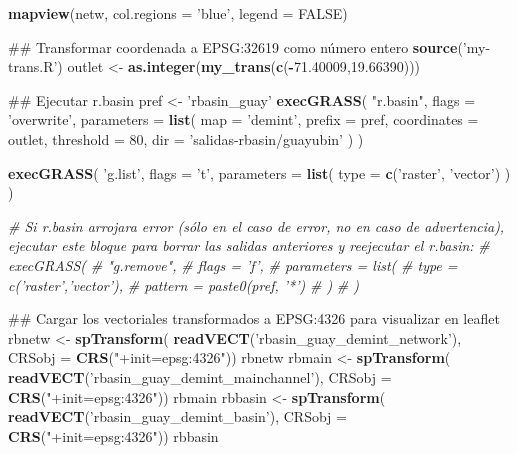 \documentclass[11pt,]{article}
\newenvironment{Shaded}{\begin{snugshade}}{\end{snugshade}}
\newcommand{\KeywordTok}[1]{\textcolor[rgb]{0.13,0.29,0.53}{\textbf{#1}}}
\newcommand{\DataTypeTok}[1]{\textcolor[rgb]{0.13,0.29,0.53}{#1}}
\newcommand{\DecValTok}[1]{\textcolor[rgb]{0.00,0.00,0.81}{#1}}
\newcommand{\FloatTok}[1]{\textcolor[rgb]{0.00,0.00,0.81}{#1}}
\newcommand{\StringTok}[1]{\textcolor[rgb]{0.31,0.60,0.02}{#1}}
\newcommand{\CommentTok}[1]{\textcolor[rgb]{0.56,0.35,0.01}{\textit{#1}}}
\newcommand{\OtherTok}[1]{\textcolor[rgb]{0.56,0.35,0.01}{#1}}
\newcommand{\OperatorTok}[1]{\textcolor[rgb]{0.81,0.36,0.00}{\textbf{#1}}}
\newcommand{\NormalTok}[1]{#1}
\begin{document}
\begin{Shaded}
\begin{Highlighting}[]
{{{{{\KeywordTok{mapview}\NormalTok{(netw, }\DataTypeTok{col.regions =} \StringTok{'blue'}\NormalTok{, }\DataTypeTok{legend =} \OtherTok{FALSE}\NormalTok{)}

\NormalTok{## Transformar coordenada a EPSG:32619 como número entero}
\KeywordTok{source}\NormalTok{(}\StringTok{'my-trans.R'}\NormalTok{)}
\NormalTok{outlet <-}\StringTok{ }\KeywordTok{as.integer}\NormalTok{(}\KeywordTok{my_trans}\NormalTok{(}\KeywordTok{c}\NormalTok{(}\OperatorTok{-}\FloatTok{71.40009}\NormalTok{,}\FloatTok{19.66390}\NormalTok{)))}

\NormalTok{## Ejecutar r.basin}
\NormalTok{pref <-}\StringTok{ 'rbasin_guay'}
\KeywordTok{execGRASS}\NormalTok{(}
  \StringTok{"r.basin"}\NormalTok{,}
  \DataTypeTok{flags =} \StringTok{'overwrite'}\NormalTok{,}
  \DataTypeTok{parameters =} \KeywordTok{list}\NormalTok{(}
    \DataTypeTok{map =} \StringTok{'demint'}\NormalTok{,}
    \DataTypeTok{prefix =}\NormalTok{ pref,}
    \DataTypeTok{coordinates =}\NormalTok{ outlet,}
    \DataTypeTok{threshold =} \DecValTok{80}\NormalTok{,}
    \DataTypeTok{dir =} \StringTok{'salidas-rbasin/guayubin'}
\NormalTok{  )}
\NormalTok{)}

\KeywordTok{execGRASS}\NormalTok{(}
  \StringTok{'g.list'}\NormalTok{,}
  \DataTypeTok{flags =} \StringTok{'t'}\NormalTok{,}
  \DataTypeTok{parameters =} \KeywordTok{list}\NormalTok{(}
    \DataTypeTok{type =} \KeywordTok{c}\NormalTok{(}\StringTok{'raster'}\NormalTok{, }\StringTok{'vector'}\NormalTok{)}
\NormalTok{  )}
\NormalTok{)}

\CommentTok{# Si r.basin arrojara error (sólo en el caso de error, no en caso de advertencia), ejecutar este bloque para borrar las salidas anteriores y reejecutar el r.basin:}
\CommentTok{#  execGRASS(}
\CommentTok{#    "g.remove",}
\CommentTok{#    flags = 'f',}
\CommentTok{#    parameters = list(}
\CommentTok{#      type = c('raster','vector'),}
\CommentTok{#      pattern = paste0(pref, '*')}
\CommentTok{#    )}
\CommentTok{#  )}

\NormalTok{## Cargar los vectoriales transformados a EPSG:4326 para visualizar en leaflet}
\NormalTok{  rbnetw <-}\StringTok{ }\KeywordTok{spTransform}\NormalTok{(}
    \KeywordTok{readVECT}\NormalTok{(}\StringTok{'rbasin_guay_demint_network'}\NormalTok{),}
    \DataTypeTok{CRSobj =} \KeywordTok{CRS}\NormalTok{(}\StringTok{"+init=epsg:4326"}\NormalTok{))}
\NormalTok{  rbnetw}
\NormalTok{  rbmain <-}\StringTok{ }\KeywordTok{spTransform}\NormalTok{(}
    \KeywordTok{readVECT}\NormalTok{(}\StringTok{'rbasin_guay_demint_mainchannel'}\NormalTok{),}
    \DataTypeTok{CRSobj =} \KeywordTok{CRS}\NormalTok{(}\StringTok{"+init=epsg:4326"}\NormalTok{))}
\NormalTok{  rbmain}
\NormalTok{  rbbasin <-}\StringTok{ }\KeywordTok{spTransform}\NormalTok{(}
    \KeywordTok{readVECT}\NormalTok{(}\StringTok{'rbasin_guay_demint_basin'}\NormalTok{),}
    \DataTypeTok{CRSobj =} \KeywordTok{CRS}\NormalTok{(}\StringTok{"+init=epsg:4326"}\NormalTok{))}
\NormalTok{  rbbasin}
 
}}}}}
\end{Highlighting}
\end{Shaded}
\end{document}
